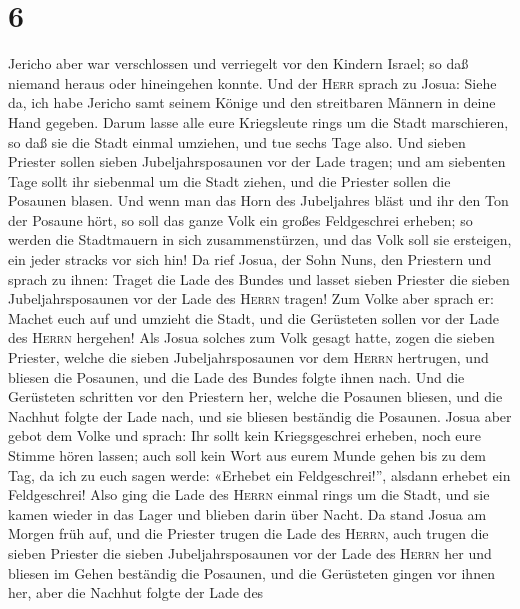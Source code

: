 \hypertarget{section-5}{%
\section{6}\label{section-5}}

 Jericho aber war verschlossen und verriegelt vor den
Kindern Israel; so daß niemand heraus oder hineingehen konnte.
 Und der \textsc{Herr} sprach zu Josua: Siehe da, ich habe
Jericho samt seinem Könige und den streitbaren Männern in deine Hand
gegeben.  Darum lasse alle eure Kriegsleute rings um die
Stadt marschieren, so daß sie die Stadt einmal umziehen, und tue sechs
Tage also.  Und sieben Priester sollen sieben
Jubeljahrsposaunen vor der Lade tragen; und am siebenten Tage sollt ihr
siebenmal um die Stadt ziehen, und die Priester sollen die Posaunen
blasen.  Und wenn man das Horn des Jubeljahres bläst und
ihr den Ton der Posaune hört, so soll das ganze Volk ein großes
Feldgeschrei erheben; so werden die Stadtmauern in sich zusammenstürzen,
und das Volk soll sie ersteigen, ein jeder stracks vor sich hin!
 Da rief Josua, der Sohn Nuns, den Priestern und sprach zu
ihnen: Traget die Lade des Bundes und lasset sieben Priester die sieben
Jubeljahrsposaunen vor der Lade des \textsc{Herrn} tragen!
 Zum Volke aber sprach er: Machet euch auf und umzieht die
Stadt, und die Gerüsteten sollen vor der Lade des \textsc{Herrn}
hergehen!  Als Josua solches zum Volk gesagt hatte, zogen
die sieben Priester, welche die sieben Jubeljahrsposaunen vor dem
\textsc{Herrn} hertrugen, und bliesen die Posaunen, und die Lade des
Bundes folgte ihnen nach.  Und die Gerüsteten schritten
vor den Priestern her, welche die Posaunen bliesen, und die Nachhut
folgte der Lade nach, und sie bliesen beständig die Posaunen.
 Josua aber gebot dem Volke und sprach: Ihr sollt kein
Kriegsgeschrei erheben, noch eure Stimme hören lassen; auch soll kein
Wort aus eurem Munde gehen bis zu dem Tag, da ich zu euch sagen werde:
«Erhebet ein Feldgeschrei!'', alsdann erhebet ein Feldgeschrei!
 Also ging die Lade des \textsc{Herrn} einmal rings um
die Stadt, und sie kamen wieder in das Lager und blieben darin über
Nacht.  Da stand Josua am Morgen früh auf, und die
Priester trugen die Lade des \textsc{Herrn},  auch trugen
die sieben Priester die sieben Jubeljahrsposaunen vor der Lade des
\textsc{Herrn} her und bliesen im Gehen beständig die Posaunen, und die
Gerüsteten gingen vor ihnen her, aber die Nachhut folgte der Lade des

